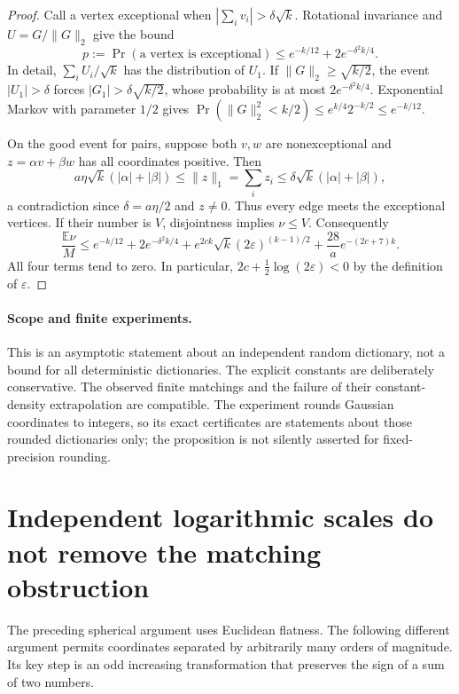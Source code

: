 \documentclass[11pt]{article}
\begin{document}
\begin{proof}
Call a vertex exceptional when
$|\sum_i v_i|>\delta\sqrt{k}$. Rotational invariance and
$U=G/\|G\|_2$ give the bound
\[
 p:=\Pr(\text{a vertex is exceptional})
 \leq e^{-k/12}+2e^{-\delta^2k/4}.
\]
In detail, $\sum_i U_i/\sqrt{k}$ has the distribution of $U_1$.
If $\|G\|_2\geq\sqrt{k/2}$, the event $|U_1|>\delta$ forces
$|G_1|>\delta\sqrt{k/2}$, whose probability is at most
$2e^{-\delta^2k/4}$. Exponential Markov with parameter $1/2$
gives
$\Pr(\|G\|_2^2<k/2)\leq e^{k/4}2^{-k/2}\leq e^{-k/12}$.

On the good event for pairs, suppose both $v,w$ are nonexceptional
and $z=\alpha v+\beta w$ has all coordinates positive. Then
\[
 a\eta\sqrt{k}(|\alpha|+|\beta|)
 \leq\|z\|_1=\sum_i z_i
 \leq\delta\sqrt{k}(|\alpha|+|\beta|),
\]
a contradiction since $\delta=a\eta/2$ and $z\ne0$.
Thus every edge meets the exceptional vertices. If their number is
$V$, disjointness implies $\nu\leq V$. Consequently
\[
 \frac{\mathbb E\nu}{M}
 \leq e^{-k/12}+2e^{-\delta^2k/4}
 +e^{2ck}\sqrt{k}(2\varepsilon)^{(k-1)/2}
 +\frac{28}{a}e^{-(2c+7)k}.
\]
All four terms tend to zero. In particular,
$2c+\tfrac12\log(2\varepsilon)<0$ by the definition of
$\varepsilon$.
\end{proof}

\paragraph{Scope and finite experiments.}
This is an asymptotic statement about an independent random dictionary,
not a bound for all deterministic dictionaries. The explicit constants
are deliberately conservative. The observed finite matchings and the
failure of their constant-density extrapolation are compatible. The
experiment rounds Gaussian coordinates to integers, so its exact
certificates are statements about those rounded dictionaries only;
the proposition is not silently asserted for fixed-precision rounding.

\section{Independent logarithmic scales do not remove the matching obstruction}

The preceding spherical argument uses Euclidean flatness. The following
different argument permits coordinates separated by arbitrarily many
orders of magnitude. Its key step is an odd increasing transformation
that preserves the sign of a sum of two numbers.
\end{document}
